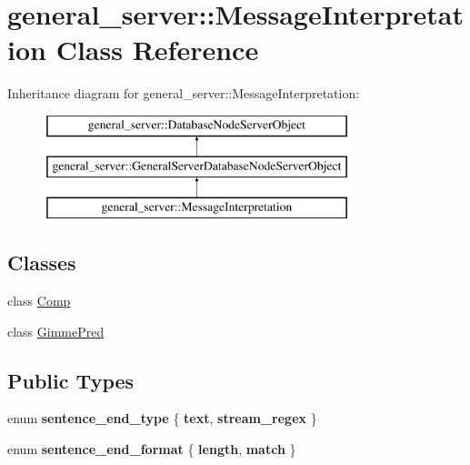 \hypertarget{classgeneral__server_1_1MessageInterpretation}{\section{general\-\_\-server\-:\-:\-Message\-Interpretation \-Class \-Reference}
\label{classgeneral__server_1_1MessageInterpretation}
}
\-Inheritance diagram for general\-\_\-server\-:\-:\-Message\-Interpretation\-:\begin{figure}[H]
\begin{center}
\leavevmode
\includegraphics[height=3.000000cm]{classgeneral__server_1_1MessageInterpretation}
\end{center}
\end{figure}
\subsection*{\-Classes}
\begin{DoxyCompactItemize}
\item 
class \hyperlink{classgeneral__server_1_1MessageInterpretation_1_1Comp}{\-Comp}
\item 
class \hyperlink{classgeneral__server_1_1MessageInterpretation_1_1GimmePred}{\-Gimme\-Pred}
\end{DoxyCompactItemize}
\subsection*{\-Public \-Types}
\begin{DoxyCompactItemize}
\item 
enum {\bfseries sentence\-\_\-end\-\_\-type} \{ {\bfseries text}, 
{\bfseries stream\-\_\-regex}
 \}
\item 
enum {\bfseries sentence\-\_\-end\-\_\-format} \{ {\bfseries length}, 
{\bfseries match}
 \}
\end{DoxyCompactItemize}
